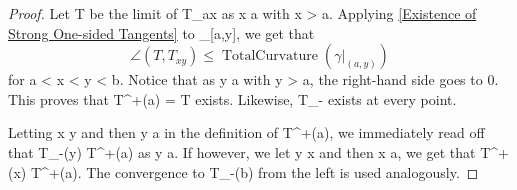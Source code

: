 \documentclass[a4paper, 11pt]{article}
\theoremstyle{plain}
\theoremstyle{definition}
\theoremstyle{remark}
\numberwithin{equation}{subsection}
\def\({}
\def\){}
\begin{document}
  
\begin{proof}
Let \(T\) be the limit of \(T_{ax}\) as \(x \rightarrow a\) with \(x > a\). Applying \cref{Existence of Strong One-sided Tangents} to \(\gamma \vert_{[a,y]}\), we get that
\begin{equation}
\angle(T, T_{xy}) \leqslant \operatorname{TotalCurvature}(\gamma \vert_{(a,y)})
\end{equation}
for \(a < x < y < b\). Notice that as \(y \rightarrow a\) with \(y > a\), the right-hand side goes to \(0\). This proves that \(T^{+}(a) = T\) exists. Likewise, \(T_{-}\) exists at every point.

Letting \(x \rightarrow y\) and then \(y \rightarrow a\) in the definition of \(T^{+}(a)\), we immediately read off that \(T_{-}(y) \rightarrow T^{+}(a)\) as \(y \rightarrow a\). If however, we let \(y \rightarrow x\) and then \(x \rightarrow a\), we get that \(T^{+}(x) \rightarrow T^{+}(a)\). The convergence to \(T_{-}(b)\) from the left is used analogously.
\end{proof}




\clearpage

\nocite{*}
\end{document}

